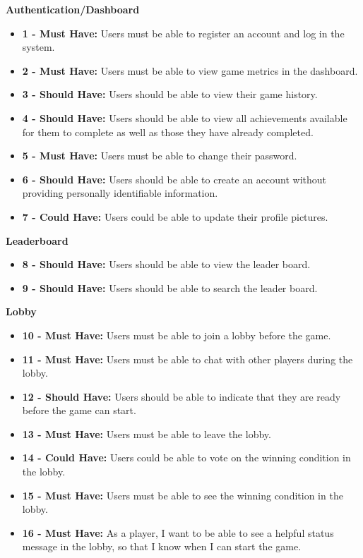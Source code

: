 \documentclass{l4proj}
\begin{document}
\textbf{Authentication/Dashboard}
\begin{itemize}
    \item[] \textbf{1 - Must Have:} Users must be able to register an account and log in the system.
    \item[] \textbf{2 - Must Have:} Users must be able to view game metrics in the dashboard.
    \item[] \textbf{3 - Should Have:} Users should be able to view their game history.
    \item[] \textbf{4 - Should Have:} Users should be able to view all achievements available for them to complete as well as those they have already completed.
    \item[] \textbf{5 - Must Have:} Users must be able to change their password.
    \item[] \textbf{6 - Should Have:} Users should be able to create an account without providing personally identifiable information.
    \item[] \textbf{7 - Could Have:} Users could be able to update their profile pictures.
\end{itemize}

\textbf{Leaderboard}
\begin{itemize}
    \item[] \textbf{8 - Should Have:} Users should be able to view the leader board.
    \item[] \textbf{9 - Should Have:} Users should be able to search the leader board.
\end{itemize}

\textbf{Lobby}
\begin{itemize}
    \item[] \textbf{10 - Must Have:} Users must be able to join a lobby before the game.
    \item[] \textbf{11 - Must Have:} Users must be able to chat with other players during the lobby.
    \item[] \textbf{12 - Should Have:} Users should be able to indicate that they are ready before the game can start.
    \item[] \textbf{13 - Must Have:} Users must be able to leave the lobby.
    \item[] \textbf{14 - Could Have:} Users could be able to vote on the winning condition in the lobby.
    \item[] \textbf{15 - Must Have:} Users must be able to see the winning condition in the lobby.
    \item[] \textbf{16 - Must Have:} As a player, I want to be able to see a helpful status message in the lobby, so that I know when I can start the game.
\end{itemize}
\end{document}
